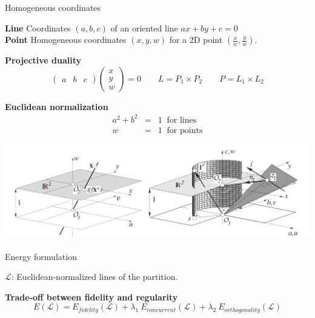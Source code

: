 \begin{frame}{Homogeneous coordinates}
	
	\textbf{Line} Coordinates $(a, b, c)$ of an oriented line $a x + b y + c = 0$\\
	\textbf{Point} Homogeneous coordinates $(x, y, w)$ for a 2D point $(\frac{x}{w}, \frac{y}{w})$.
	\pause
	
	\textbf{Projective duality}
	\[ 
		\begin{pmatrix} a & b & c \end{pmatrix} \begin{pmatrix} x \\ y \\ w \end{pmatrix} = 0
		\quad\quad
		L = P_1 \times P_2
		\quad\quad
		P = L_1 \times L_2
	\]	
	\pause

	\begin{minipage}{0.4\linewidth}
	\textbf{Euclidean normalization}
	\begin{eqnarray*}
		a^2 + b^2 &=& 1 \: \textrm{ for lines}\\
		w &=& 1 \: \textrm{ for points}
	\end{eqnarray*}	
	\end{minipage}%
	\begin{minipage}{0.6\linewidth}
		\includegraphics[width=\linewidth]{euclidean_normalization}
	\end{minipage}
	
\end{frame}

\begin{frame}{Energy formulation}
	
	$\mathcal{L}$: Euclidean-normalized lines of the partition.
	
	\vspace{1cm}
	
	\textbf{Trade-off between fidelity and regularity}
	\[ 
		E(\mathcal{L}) = E_{fidelity}(\mathcal{L}) + \lambda_1 \: E_{concurrent}(\mathcal{L}) + {\lambda_2} \: E_{orthogonality}(\mathcal{L})
	\]
\end{frame}

